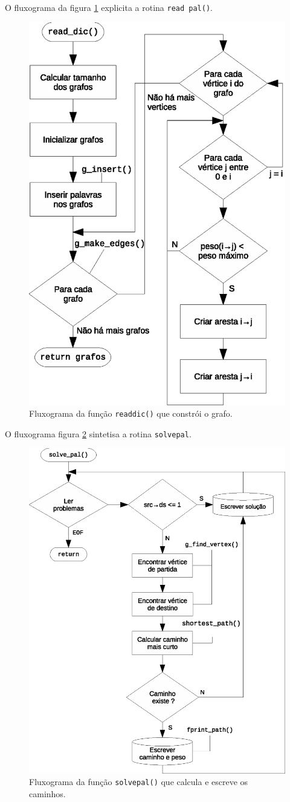 \documentclass[portuguese, a4paper]{article}
\newcommand\tu[0]{\textunderscore}
\begin{document}
	\par
	O fluxograma da figura \ref{make_graph} explicita a rotina \texttt{read\tu
	pal()}.
	\begin{figure}[H]
		\centering
		\includegraphics[width=0.70\linewidth]{read_dic}
		\caption{Fluxograma da função \texttt{read\tu dic()} que constrói o grafo.}
		\label{make_graph}
	\end{figure}
	\par
	O fluxograma figura \ref{solve_pal} sintetisa a rotina \texttt{solve\tu pal}.
	\begin{figure}[H]
		\centering
		\includegraphics[width=0.70\linewidth]{solve_pal}
		\caption{Fluxograma da função \texttt{solve\tu pal()} que calcula e
		escreve os caminhos.}
		\label{solve_pal}
	\end{figure}
\end{document}
